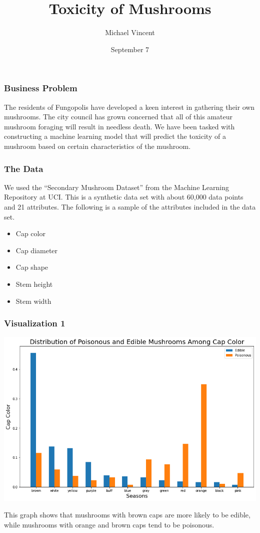 \documentclass[]{beamer}
\title{Toxicity of Mushrooms}
\author{Michael Vincent}
\institute{Coding Dojo}
\date{September 7}
\begin{document}
\maketitle

\begin{frame}
\frametitle{Business Problem}

The residents of Fungopolis have developed a keen interest in gathering their own mushrooms. The city council has grown concerned that all of this amateur mushroom foraging will result in needless death. We have been tasked with constructing a machine learning model that will predict the toxicity of a mushroom based on certain characteristics of the mushroom.
\end{frame}

\begin{frame}
\frametitle{The Data}

We used the ``Secondary Mushroom Dataset'' from the Machine Learning Repository at UCI. This is a synthetic data set with about 60,000 data points and 21 attributes. The following is a sample of the attributes included in the data set.
\pause
\begin{itemize}
\item Cap color
\item Cap diameter
\item Cap shape
\item Stem height
\item Stem width
\end{itemize}
\end{frame}


\begin{frame}
\frametitle{Visualization 1}
\begin{center}
\includegraphics[scale = 0.3]{toxicity_by_color.png}
\end{center}

\pause
This graph shows that mushrooms with brown caps are more likely to be edible, while mushrooms with orange and brown caps tend to be poisonous.
\end{frame}
\end{document}
